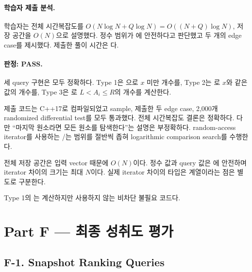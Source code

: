 \paragraph{학습자 제출 분석.}
학습자는 전체 시간복잡도를 $O(N\log N+Q\log N)=O((N+Q)\log N)$, 저장 공간을 $O(N)$으로 설명했다. 정수 범위가 에 안전하다고 판단했고 두 개의 edge case를 제시했다. 제출한 풀이 시간은 다.

\paragraph{판정: PASS.}
세 query 구현은 모두 정확하다. Type 1은 으로 $x$ 미만 개수를, Type 2는 로 $x$와 같은 값의 개수를, Type 3은 로 $L<A_i\le R$의 개수를 계산한다.

제출 코드는 C++17로 컴파일되었고 sample, 제출한 두 edge case, 2,000개 randomized differential test를 모두 통과했다. 전체 시간복잡도 결론은 정확하다. 다만 ``마지막 원소라면 모든 원소를 탐색한다''는 설명은 부정확하다. random-access iterator를 사용하는 /는 범위를 절반씩 좁혀 logarithmic comparison search를 수행한다.

전체 저장 공간은 입력 vector 때문에 $O(N)$이다. 정수 값과 query 값은 에 안전하며 iterator 차이의 크기는 최대 $N$이다. 실제 iterator 차이의 타입은  계열이라는 점은 별도로 구분한다.

Type 1의 는 계산하지만 사용하지 않는 비차단 불필요 코드다.


\section{Part F --- 최종 성취도 평가}

\subsection{F-1. Snapshot Ranking Queries}


